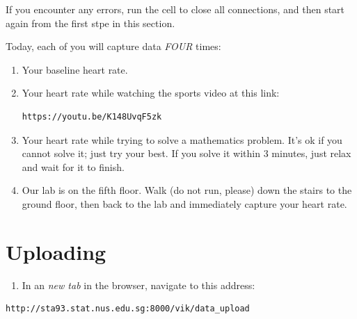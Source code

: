 \documentclass[11pt]{article}
\providecommand{\tightlist}{%
  \setlength{\itemsep}{0pt}\setlength{\parskip}{0pt}}
\begin{document}
If you encounter any errors, run the cell to close all connections, and then
start again from the first stpe in this section.

Today, each of you will capture data \emph{FOUR} times:

\begin{enumerate}
\def\labelenumi{\arabic{enumi}.}
\tightlist
\item
  Your baseline heart rate.
\item
  Your heart rate while watching the sports video at this link:
\begin{verbatim}
https://youtu.be/K148UvqF5zk
\end{verbatim}

\item
  Your heart rate while trying to solve a mathematics problem. It's ok if
  you cannot solve it; just try your best. If you solve it within 3
  minutes, just relax and wait for it to finish.
\item
  Our lab is on the fifth floor. Walk (do not run, please) down the
  stairs to the ground floor, then back to the lab and immediately
  capture your heart rate.
\end{enumerate}

\hypertarget{uploading}{%
\section{Uploading}\label{uploading}}

\begin{enumerate}
\def\labelenumi{\arabic{enumi}.}
\tightlist
\item
  In an \emph{new tab} in the browser, navigate to this address:
\end{enumerate}

\begin{verbatim}
http://sta93.stat.nus.edu.sg:8000/vik/data_upload
\end{verbatim}
\end{document}
